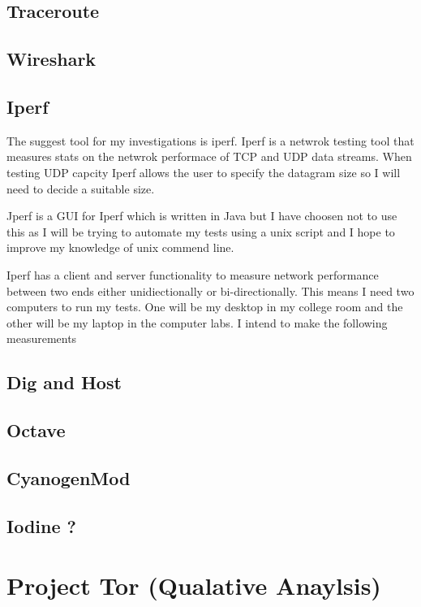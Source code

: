 \documentclass[12pt,a4paper,oneside]{article}
\begin{document}
\subsection{Traceroute}
\subsection{Wireshark}
\subsection{Iperf}
The suggest tool for my investigations is iperf. Iperf is a netwrok testing tool that measures stats on the netwrok performace of TCP and UDP data streams.  When testing UDP capcity Iperf allows the user to specify the datagram size so I will need to decide a suitable size. 

Jperf is a GUI for Iperf which is written in Java but I have choosen not to use this as I will be trying to automate my tests using a unix script and I hope to improve my knowledge of unix commend line.

Iperf has a client and server functionality to measure network performance between two ends either unidiectionally or bi-directionally. This means I need two computers to run my tests. One will be my desktop in my college room and the other will be my laptop in the computer labs. I intend to make the following measurements
\subsection{Dig and Host}
\subsection{Octave}

\subsection{CyanogenMod}

\subsection{Iodine ?}


\section{Project Tor (Qualative Anaylsis)}
\end{document}
